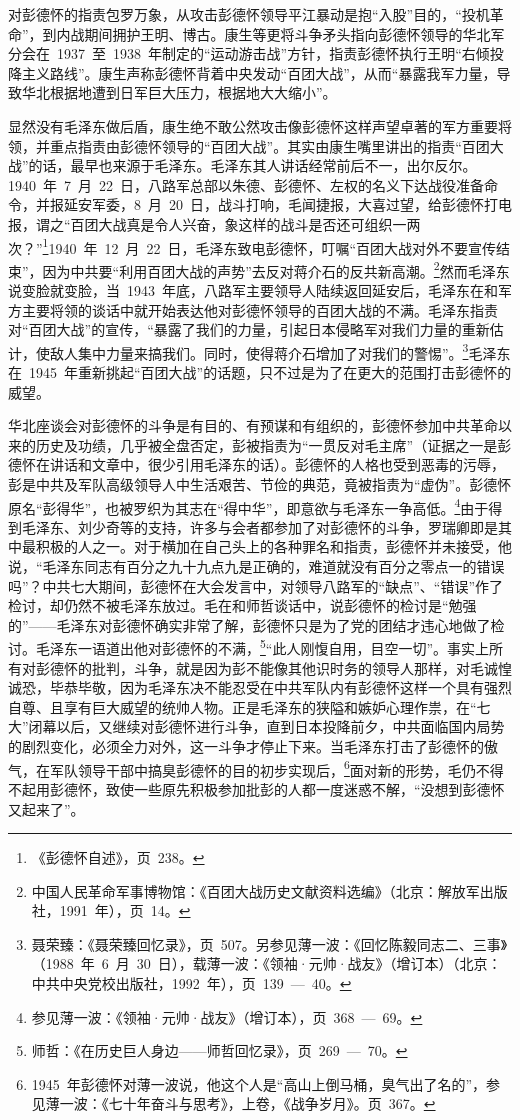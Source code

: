 对彭德怀的指责包罗万象，从攻击彭德怀领导平江暴动是抱“入股”目的，“投机革命”，到内战期间拥护王明、博古。康生等更将斗争矛头指向彭德怀领导的华北军分会在~1937~至~1938~年制定的“运动游击战”方针，指责彭德怀执行王明“右倾投降主义路线”。康生声称彭德怀背着中央发动“百团大战”，从而“暴露我军力量，导致华北根据地遭到日军巨大压力，根据地大大缩小”。

显然没有毛泽东做后盾，康生绝不敢公然攻击像彭德怀这样声望卓著的军方重要将领，并重点指责由彭德怀领导的“百团大战”。其实由康生嘴里讲出的指责“百团大战”的话，最早也来源于毛泽东。毛泽东其人讲话经常前后不一，出尔反尔。1940~年~7~月~22~日，八路军总部以朱德、彭德怀、左权的名义下达战役准备命令，并报延安军委，8~月~20~日，战斗打响，毛闻捷报，大喜过望，给彭德怀打电报，谓之“百团大战真是令人兴奋，象这样的战斗是否还可组织一两次？”\footnote{《彭德怀自述》，页~238。}1940~年~12~月~22~日，毛泽东致电彭德怀，叮嘱“百团大战对外不要宣传结束”，因为中共要“利用百团大战的声势”去反对蒋介石的反共新高潮。\footnote{中国人民革命军事博物馆：《百团大战历史文献资料选编》（北京：解放军出版社，1991~年），页~14。}然而毛泽东说变脸就变脸，当~1943~年底，八路军主要领导人陆续返回延安后，毛泽东在和军方主要将领的谈话中就开始表达他对彭德怀领导的百团大战的不满。毛泽东指责对“百团大战”的宣传，“暴露了我们的力量，引起日本侵略军对我们力量的重新估计，使敌人集中力量来搞我们。同时，使得蒋介石增加了对我们的警惕”。\footnote{聂荣臻：《聂荣臻回忆录》，页~507。另参见薄一波：《回忆陈毅同志二、三事》（1988~年~6~月~30~日），载薄一波：《领袖·元帅·战友》（增订本）（北京：中共中央党校出版社，1992~年），页~139~—~40。}毛泽东在~1945~年重新挑起“百团大战”的话题，只不过是为了在更大的范围打击彭德怀的威望。

华北座谈会对彭德怀的斗争是有目的、有预谋和有组织的，彭德怀参加中共革命以来的历史及功绩，几乎被全盘否定，彭被指责为“一贯反对毛主席”（证据之一是彭德怀在讲话和文章中，很少引用毛泽东的话）。彭德怀的人格也受到恶毒的污辱，彭是中共及军队高级领导人中生活艰苦、节俭的典范，竟被指责为“虚伪”。彭德怀原名“彭得华”，也被罗织为其志在“得中华”，即意欲与毛泽东一争高低。\footnote{参见薄一波：《领袖·元帅·战友》（增订本），页~368~—~69。}由于得到毛泽东、刘少奇等的支持，许多与会者都参加了对彭德怀的斗争，罗瑞卿即是其中最积极的人之一。对于横加在自己头上的各种罪名和指责，彭德怀并未接受，他说，“毛泽东同志有百分之九十九点九是正确的，难道就没有百分之零点一的错误吗”？中共七大期间，彭德怀在大会发言中，对领导八路军的“缺点”、“错误”作了检讨，却仍然不被毛泽东放过。毛在和师哲谈话中，说彭德怀的检讨是“勉强的”——毛泽东对彭德怀确实非常了解，彭德怀只是为了党的团结才违心地做了检讨。毛泽东一语道出他对彭德怀的不满，\footnote{师哲：《在历史巨人身边——师哲回忆录》，页~269~—~70。}“此人刚愎自用，目空一切”。事实上所有对彭德怀的批判，斗争，就是因为彭不能像其他识时务的领导人那样，对毛诚惶诚恐，毕恭毕敬，因为毛泽东决不能忍受在中共军队内有彭德怀这样一个具有强烈自尊、且享有巨大威望的统帅人物。正是毛泽东的狭隘和嫉妒心理作祟，在“七大”闭幕以后，又继续对彭德怀进行斗争，直到日本投降前夕，中共面临国内局势的剧烈变化，必须全力对外，这一斗争才停止下来。当毛泽东打击了彭德怀的傲气，在军队领导干部中搞臭彭德怀的目的初步实现后，\footnote{1945~年彭德怀对薄一波说，他这个人是“高山上倒马桶，臭气出了名的”，参见薄一波：《七十年奋斗与思考》，上卷，《战争岁月》。页~367。}面对新的形势，毛仍不得不起用彭德怀，致使一些原先积极参加批彭的人都一度迷惑不解，“没想到彭德怀又起来了”。

